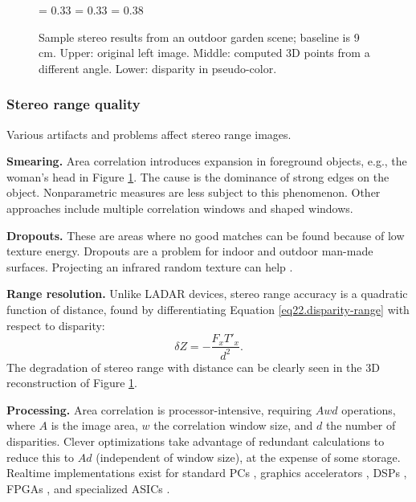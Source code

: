 \documentclass[twocolumn,oneside]{book}
\begin{document}
\begin{figure}

{\epsfxsize = 0.33\textwidth {}}
{\epsfxsize = 0.33\textwidth {}}
{\epsfxsize = 0.38\textwidth {}}

\caption{
Sample stereo results from an outdoor garden scene; baseline is 9 cm.
Upper: original left image.  Middle: computed 3D points from a
different angle.  Lower: disparity in pseudo-color.
\label{fig23.garden-results}}

\end{figure}


\subsubsection{Stereo range quality}

Various artifacts and problems affect stereo range images.

{\bf Smearing.}  Area correlation introduces expansion in foreground
objects, e.g., the woman's head in Figure \ref{fig23.garden-results}.
The cause is the dominance of strong edges on the object.
Nonparametric measures are less subject to this phenomenon.  Other
approaches include multiple correlation windows and shaped windows.

{\bf Dropouts.}  These are areas where no good matches can be found
because of low texture energy.  Dropouts are a problem for indoor and
outdoor man-made surfaces.  Projecting an infrared random texture can
help \cite{adan}.

{\bf Range resolution.}  Unlike LADAR devices, stereo range accuracy
is a quadratic function of distance, found by differentiating Equation
\ref{eq22.disparity-range} with respect to disparity:
\begin{equation}
 \delta Z = -\frac{F_x T'_x}{d^2}.
\end{equation}
The degradation of stereo range with distance can be clearly seen in
the 3D reconstruction of Figure \ref{fig23.garden-results}.

{\bf Processing.}  Area correlation is processor-intensive, requiring
$Awd$ operations, where $A$ is the image area, $w$ the correlation
window size, and $d$ the number of disparities.  Clever optimizations
take advantage of redundant calculations to reduce this to $Ad$
(independent of window size), at the expense of some storage.
Realtime implementations exist for standard PCs \cite{videre,ptgrey},
graphics accelerators \cite{zach03accurate,yang03multiresolution},
DSPs \cite{konolige97}, FPGAs \cite{videre,focusrobotics}, and
specialized ASICs \cite{tyzx}.
\end{document}
